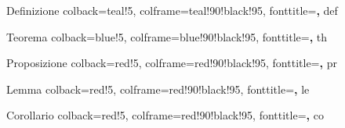 \usepackage[italian]{babel}
\usepackage{amsfonts}
\usepackage{amssymb}
\usepackage{tikz}
\usetikzlibrary{cd}
\usepackage{extarrows}
\usepackage{mathrsfs}
\usepackage{amsthm}

\usepackage{tcolorbox}
\usepackage{hyperref}
\usepackage{graphicx}
\graphicspath{ {./Immagini/} }
\usepackage{bm}
\usepackage{fouriernc}
\usepackage[T1]{fontenc}
\usepackage{tikzrput}
\usepackage[object=vectorian]{pgfornament}
\usepackage{xcolor}
\usepackage{fourier-orns}
\usepackage{fancyhdr}
\renewcommand{\headrule}{%
\vspace{-8pt}\hrulefill
\raisebox{-2.1pt}{\quad\decofourleft\decotwo\decofourright\quad}\hrulefill}
\usetikzlibrary{cd,decorations.pathmorphing,patterns}
\usepackage[T1]{fontenc}
\usetikzlibrary{decorations.markings}


	{Definizione}%
	{%
		colback=teal!5,
		colframe=teal!90!black!95,
		fonttitle=\bfseries,
	}%
	{def}%

	{Teorema}%
	{%
		colback=blue!5,
		colframe=blue!90!black!95,
		fonttitle=\bfseries,
	}%
	{th}%

	{Proposizione}%
	{%
		colback=red!5,
		colframe=red!90!black!95,
		fonttitle=\bfseries,
	}%
	{pr}%

	{Lemma}%
	{%
		colback=red!5,
		colframe=red!90!black!95,
		fonttitle=\bfseries,
	}%
	{le}%

	{Corollario}%
	{%
		colback=red!5,
		colframe=red!90!black!95,
		fonttitle=\bfseries,
	}%
	{co}%

\newcommand{\vareps}{\varepsilon}
\newtheorem{es}{Esempio}
\theoremstyle{definition}
\newtheorem*{oss}{Osservazione}
\newtheorem{ese}{Esercizio}

\newenvironment{sol}
	{\renewcommand\qedsymbol{$\blacksquare$}\begin{proof}[Soluzione]}
	{\end{proof}}

